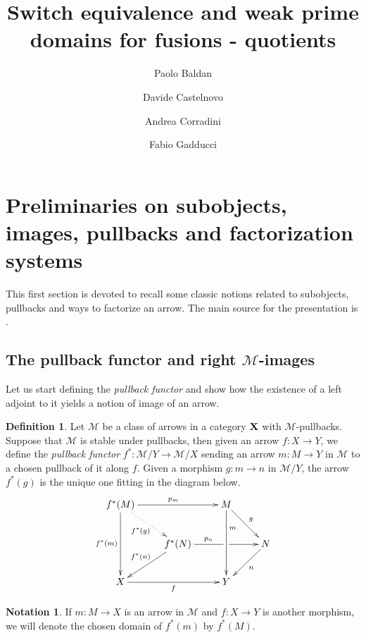 \documentclass[a4paper]{article}
\title{Switch equivalence and weak prime domains for fusions - quotients}
\author{Paolo Baldan\and Davide Castelnovo\and  Andrea Corradini\and Fabio Gadducci}
\def\X{\textbf {\textup{X}}}
\theoremstyle{definition}
\newtheorem{definition}[theorem]{Definition}
\newtheorem*{notation}{Notation}
\begin{document}
\maketitle


\section{Preliminaries on subobjects, images, pullbacks and factorization systems}\label{app:fact}


This first section is devoted to recall some classic notions related to subobjects, pullbacks and ways to factorize an arrow. The main source for the presentation is \cite[Ch.~1]{dikranjan2013categorical}.
\subsection{The pullback functor and right $\mathcal{M}$-images}

Let us start defining the \emph{pullback functor} and show how the existence of a left adjoint to it yields a notion of image of an arrow.

\begin{definition}
	Let $\mathcal{M}$ be a class of arrows in a category $\X$ with $\mathcal{M}$-pullbacks. Suppose that $\mathcal{M}$ is stable under pullbacks, then given an arrow $f\colon X\to Y$, we define the \emph{pullback functor} $f^*\colon \mathcal{M}/Y\to \mathcal{M}/X$ sending an arrow $m:M\to Y$ in $\mathcal{M}$ to a chosen pullback of it along $f$. Given a morphism $g:m\to n$ in $\mathcal{M}/Y$, the arrow $f^*(g)$ is the unique one fitting in the diagram below.
	\[\xymatrix{f^*(M)  \ar[dd]_{f^*(m)} \ar@{.>}[dr]_{f^*(g)}\ar[rr]^{p_m}&& M \ar[dr]^{g}\ar[dd]^(.3){m} \\&f^*(N)  \ar[rr]^(.35){p_n}|(.55)\hole \ar[dl]_{f^*(n)}&& N \ar[dl]^{n}\\ X \ar[rr]_{f}&& Y }\]
\end{definition}

\begin{notation}
If $m\colon M\to X$ is an arrow in $\mathcal{M}$ and $f\colon X\to Y$ is another morphism, we will denote the chosen domain of $f^*(m)$ by $f^*(M)$.
\end{notation}
\end{document}
